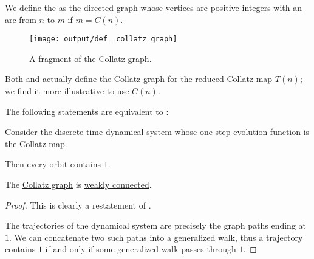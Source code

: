 \begin{definition}\label{def:collatz_graph}
  We define the  as the \hyperref[def:directed_graph]{directed graph} whose vertices are positive integers with an arc from \( n \) to \( m \) if \( m = C(n) \).

  \begin{figure}[!ht]
    \centering
    \texttt{[image: output/def\_\_collatz\_graph]}
    \caption{A fragment of the \hyperref[def:collatz_graph]{Collatz graph}.}\label{fig:def:collatz_graph}
  \end{figure}
\end{definition}
\begin{comments}
  \item Both  and  actually define the Collatz graph for the reduced Collatz map \( T(n) \); we find it more illustrative to use \( C(n) \).
\end{comments}

\begin{theorem}\label{hyp:collatz_conjectures_equivalences}
  The following statements are \hyperref[def:logical_theory/equivalent]{equivalent} to :
  \begin{thmenum}[series=thm:axiom_of_choice_equivalences]
     Consider the \hyperref[def:discrete_dynamical_system]{discrete-time} \hyperref[def:dynamical_system]{dynamical system} whose \hyperref[def:one_step_evolution_function]{one-step evolution function} is the \hyperref[def:collatz_map]{Collatz map}.

    Then every \hyperref[def:dynamical_system_trajectory]{orbit} contains \( 1 \).

     The \hyperref[def:collatz_graph]{Collatz graph} is \hyperref[def:graph_connectedness/weak]{weakly connected}.
  \end{thmenum}
\end{theorem}
\begin{proof}
   This is clearly a restatement of .

   The trajectories of the dynamical system are precisely the graph paths ending at \( 1 \). We can concatenate two such paths into a generalized walk, thus a trajectory contains \( 1 \) if and only if some generalized walk passes through \( 1 \).
\end{proof}
